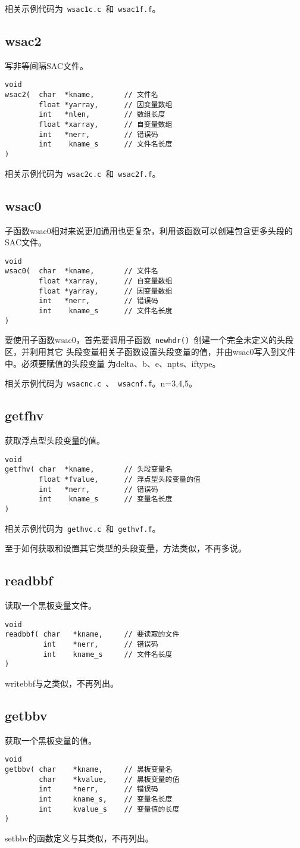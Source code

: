相关示例代码为~\verb+wsac1c.c+~和~\verb+wsac1f.f+。

\subsection{wsac2}
写非等间隔SAC文件。

\begin{verbatim}
void
wsac2(  char  *kname,       // 文件名
        float *yarray,      // 因变量数组
        int   *nlen,        // 数组长度
        float *xarray,      // 自变量数组
        int   *nerr,        // 错误码
        int    kname_s      // 文件名长度
)
\end{verbatim}

相关示例代码为~\verb+wsac2c.c+~和~\verb+wsac2f.f+。

\subsection{wsac0}
子函数wsac0相对来说更加通用也更复杂，利用该函数可以创建包含更多头段的SAC文件。

\begin{verbatim}
void
wsac0(  char  *kname,       // 文件名
        float *xarray,      // 自变量数组
        float *yarray,      // 因变量数组
        int   *nerr,        // 错误码
        int    kname_s      // 文件名长度
)
\end{verbatim}

要使用子函数wsac0，首先要调用子函数~\verb+newhdr()+~创建一个完全未定义的头段区，并利用其它
头段变量相关子函数设置头段变量的值，并由wsac0写入到文件中。必须要赋值的头段变量
为delta、b、e、npts、iftype。

相关示例代码为~\verb+wsacnc.c+~、~\verb+wsacnf.f+。n=3,4,5。

\subsection{getfhv}
获取浮点型头段变量的值。
\begin{verbatim}
void
getfhv( char  *kname,       // 头段变量名
        float *fvalue,      // 浮点型头段变量的值
        int   *nerr,        // 错误码
        int    kname_s      // 变量名长度
)
\end{verbatim}

相关示例代码为~\verb+gethvc.c+~和~\verb+gethvf.f+。

至于如何获取和设置其它类型的头段变量，方法类似，不再多说。

\subsection{readbbf}
读取一个黑板变量文件。
\begin{verbatim}
void
readbbf( char   *kname,     // 要读取的文件
         int    *nerr,      // 错误码
         int    kname_s     // 文件名长度
)
\end{verbatim}

writebbf与之类似，不再列出。

\subsection{getbbv}
获取一个黑板变量的值。
\begin{verbatim}
void
getbbv( char    *kname,     // 黑板变量名
        char    *kvalue,    // 黑板变量的值
        int     *nerr,      // 错误码
        int     kname_s,    // 变量名长度
        int     kvalue_s    // 变量值的长度
)
\end{verbatim}
setbbv的函数定义与其类似，不再列出。
